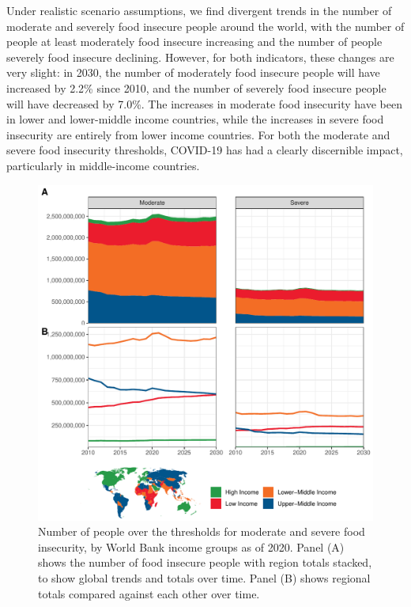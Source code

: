 \documentclass{article}
\begin{document}
Under realistic scenario assumptions, we find divergent trends in the number of moderate and severely food insecure people around the world, with the number of people at least moderately food insecure increasing and the number of people severely food insecure declining.  However, for both indicators, these changes are very slight: in 2030, the number of moderately food insecure people will have increased by 2.2\% since 2010, and the number of severely food insecure people will have decreased by 7.0\%.  The increases in moderate food insecurity have been in lower and lower-middle income countries, while the increases in severe food insecurity are entirely from lower income countries.  For both the moderate and severe food insecurity thresholds, COVID-19 has had a clearly discernible impact, particularly in middle-income countries.

\begin{figure}[H]
  \centering
  \includegraphics[width=\linewidth]{img/TimeSeries.pdf}
  \caption{Number of people over the thresholds for moderate and severe food insecurity, by World Bank income groups as of 2020.  Panel (A) shows the number of food insecure people with region totals stacked, to show global trends and totals over time.  Panel (B) shows regional totals compared against each other over time.}
  \label{fig:timeseries}
\end{figure}
\end{document}
